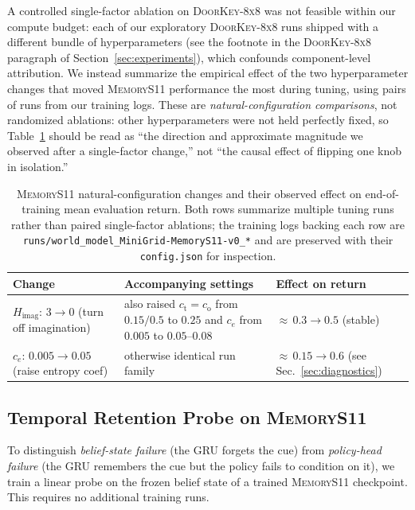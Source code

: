 \documentclass[letterpaper]{article}
\begin{document}
A controlled single-factor ablation on \textsc{DoorKey-8x8} was not
feasible within our compute budget: each of our exploratory
\textsc{DoorKey-8x8} runs shipped with a different bundle of
hyperparameters (see the footnote in the \textsc{DoorKey-8x8} paragraph of
Section~\ref{sec:experiments}), which confounds component-level
attribution. We instead summarize the empirical effect of the two
hyperparameter changes that moved \textsc{MemoryS11} performance the most
during tuning, using pairs of runs from our training logs. These are
\emph{natural-configuration comparisons}, not randomized ablations: other
hyperparameters were not held perfectly fixed, so Table~\ref{tab:ablation}
should be read as ``the direction and approximate magnitude we observed
after a single-factor change,'' not ``the causal effect of flipping one
knob in isolation.''

\begin{table}[!tbp]
\centering
\footnotesize
\setlength{\tabcolsep}{4pt}
\begin{tabular}{p{}p{}p{}}
\toprule
Change & Accompanying settings & Effect on return \\
\midrule
$H_\text{imag}{:}\,3{\to}0$ (turn off imagination)
  & also raised $c_\text{t}{=}c_\text{o}$ from $0.15/0.5$ to $0.25$
    and $c_e$ from $0.005$ to $0.05$--$0.08$
  & ${\approx}\,0.3{\to}0.5$ (stable) \\
$c_e{:}\,0.005{\to}0.05$ (raise entropy coef)
  & otherwise identical run family
  & ${\approx}\,0.15{\to}0.6$ (see Sec.~\ref{sec:diagnostics}) \\
\bottomrule
\end{tabular}
\caption{\textsc{MemoryS11} natural-configuration changes and their
observed effect on end-of-training mean evaluation return. Both rows
summarize multiple tuning runs rather than paired single-factor
ablations; the training logs backing each row are
\texttt{runs/world\_model\_MiniGrid-MemoryS11-v0\_*} and are preserved
with their \texttt{config.json} for inspection.}
\label{tab:ablation}
\end{table}

\subsection{Temporal Retention Probe on \textsc{MemoryS11}}
\label{sec:probe}

To distinguish \emph{belief-state failure} (the GRU forgets the cue) from
\emph{policy-head failure} (the GRU remembers the cue but the policy fails
to condition on it), we train a linear probe on the frozen belief state
of a trained \textsc{MemoryS11} checkpoint. This requires no additional
training runs.
\end{document}
